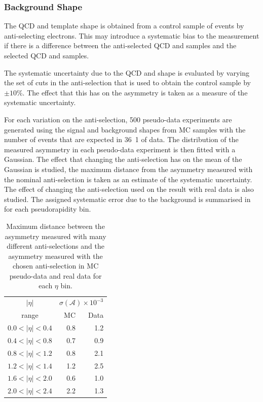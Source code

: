 \subsubsection{Background \ETm Shape}

The {QCD} and \gjet \ETm template shape is obtained from a control sample of
events by anti-selecting electrons. This may introduce a systematic bias to the
measurement if there is a difference between the anti-selected {QCD} and \gjet
\ETm samples and the selected {QCD} and \gjet samples.

The systematic uncertainty due to the {QCD} and \gjet \ETm shape is evaluated by
varying the set of cuts in the anti-selection that is used to obtain the control
sample by $\pm10\%$. The effect that this has on the asymmetry is taken
as a measure of the systematic uncertainty.

For each variation on the anti-selection, 500 pseudo-data experiments are
generated using the signal and background \ETm shapes from MC samples with the
number of events that are expected in \unit{36.1}{\invpb} of data. The
distribution of the measured asymmetry in each pseudo-data experiment is then
fitted with a Gaussian.  The effect that changing the anti-selection has on the
mean of the Gaussian is studied, the maximum distance from the asymmetry
measured with the nominal anti-selection is taken as an estimate of the
systematic uncertainty.  The effect of changing the anti-selection used on the
result with real data is also studied.  The assigned systematic error due to the
background is summarised in  for each pseudorapidity bin.

\begin{table}[htbp]
\begin{center}
\begin{tabular}{crr}
    \toprule
$|\eta|$  &\multicolumn{2}{c}{ $\sigma(\mathcal{A}) \times 10^{-3}$}\\
   range      & MC & Data\\
\midrule
$0.0<|\eta|<0.4$ & 0.8 & 1.2\\
$0.4<|\eta|<0.8$ & 0.7 & 0.9\\
$0.8<|\eta|<1.2$ & 0.8 & 2.1\\
$1.2<|\eta|<1.4$ & 1.2 & 2.5\\
$1.6<|\eta|<2.0$ & 0.6 & 1.0\\
$2.0<|\eta|<2.4$ & 2.2 & 1.3\\
    \bottomrule
\end{tabular}
\caption[Maximum distance between the asymmetry measured with many different anti-selections
and the asymmetry measured with the chosen anti-selection in MC pseudo-data and
real data.]{Maximum distance between the asymmetry measured with many different anti-selections
and the asymmetry measured with the chosen anti-selection in MC pseudo-data and
real data for each $\eta$ bin\cite{baisini2010electron}.}
\label{tab:systQCD}
\end{center}
\end{table}

